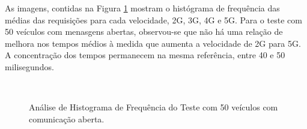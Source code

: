 \documentclass[
	12pt,				%
	oneside,			%
	a4paper,			%
	english,			%
	brazil				%
	]{abntex2ppgsi}
\begin{document}
As imagens, contidas na Figura \ref{fig:imgHistFreq50} mostram o histógrama de frequência das médias das requisições para cada velocidade, 2G, 3G, 4G e 5G. Para o teste com 50 veículos com menasgens abertas, observou-se que não há uma relação de melhora nos tempos médios à medida que aumenta a velocidade de 2G para 5G.  A concentração dos tempos permanecem na mesma referência, entre 40 e 50 milisegundos.

\begin{figure}[h!]
	\caption{Análise de Histograma de Frequência do Teste  com 50 veículos com comunicação aberta.}
	\centering
	\label{fig:imgHistFreq50}
	\\
\end{figure}
\end{document}
